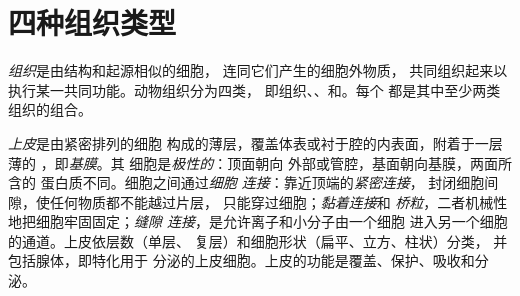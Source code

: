 \section{四种组织类型}

\begin{definition}[组织]\label{def:b1:body-plans-tissues:tissue}
\emph{组织}是由结构和起源相似的细胞，
连同它们产生的细胞外物质，
共同组织起来以执行某一共同功能。动物组织分为四类，
即组织、、和。每个
都是其中至少两类组织的组合。
\end{definition}

\begin{definition}[上皮组织]\label{def:b1:body-plans-tissues:epithelium}
\emph{上皮}是由紧密排列的细胞
构成的薄层，覆盖体表或衬于腔的内表面，附着于一层薄的
，即\emph{基膜}。其
细胞是\emph{极性的}：顶面朝向
外部或管腔，基面朝向基膜，两面所含的
蛋白质不同。细胞之间通过\emph{细胞
连接}：靠近顶端的\emph{紧密连接}，
封闭细胞间隙，使任何物质都不能越过片层，
只能穿过细胞；\emph{黏着连接}和
\emph{桥粒}，二者机械性地把细胞牢固固定；\emph{缝隙
连接}，是允许离子和小分子由一个细胞
进入另一个细胞的通道。上皮依层数（单层、
复层）和细胞形状（扁平、立方、柱状）分类，
并包括腺体，即特化用于
分泌的上皮细胞。上皮的功能是覆盖、保护、吸收和分泌。
\end{definition}

